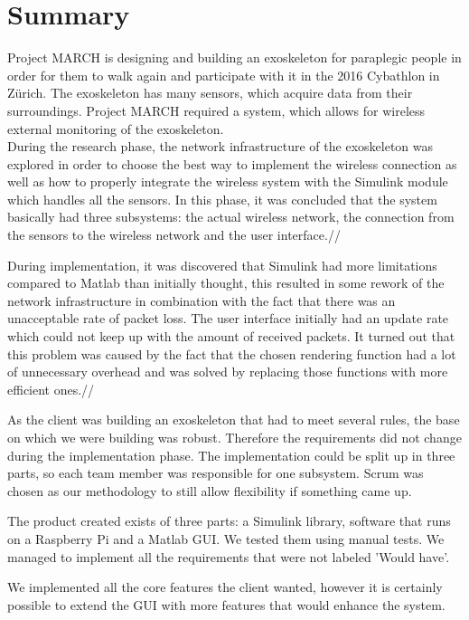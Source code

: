 \chapter*{Summary}
Project MARCH is designing and building an exoskeleton for paraplegic people in order for them to walk again and participate with it in the 2016 Cybathlon in Zürich.  
The exoskeleton has many sensors, which acquire data from their surroundings. Project MARCH required a system, which allows for wireless external monitoring of the exoskeleton. \\
During the research phase, the network infrastructure of the exoskeleton was explored in order to choose the best way to implement the wireless connection as well as how to properly integrate the wireless system with the Simulink module which handles all the sensors. In this phase, it was concluded that the system basically had three subsystems: the actual wireless network, the connection from the sensors to the wireless network and the user interface.//

During implementation, it was discovered that Simulink had more limitations compared to Matlab than initially thought, this resulted in some rework of the network infrastructure in combination with the fact that there was an unacceptable rate of packet loss. The user interface initially had an update rate which could not keep up with the amount of received packets. It turned out that this problem was caused by the fact that the chosen rendering function had a lot of unnecessary overhead and was solved by replacing those functions with more efficient ones.//

As the client was building an exoskeleton that had to meet several rules, the base on which we were building was robust. Therefore the requirements did not change during the implementation phase. The implementation could be split up in three parts, so each team member was responsible for one subsystem. Scrum was chosen as our methodology to still allow flexibility if something came up.

The product created exists of three parts: a Simulink library, software that runs on a Raspberry Pi and a Matlab GUI. We tested them using manual tests. We managed to implement all the requirements that were not labeled 'Would have'. 

We implemented all the core features the client wanted, however it is certainly possible to extend the GUI with more features that would enhance the system.	



